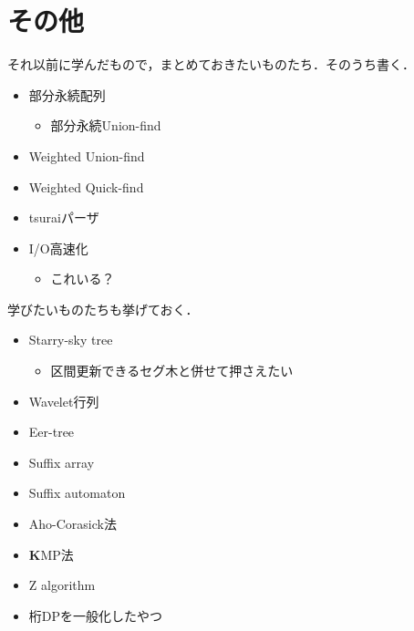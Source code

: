 \documentclass[a4paper]{jsarticle}
\begin{document}
\section{その他}
それ以前に学んだもので，まとめておきたいものたち．そのうち書く．
\begin{itemize}
\item 部分永続配列
  \begin{itemize}
  \item 部分永続Union-find
  \end{itemize}
\item Weighted Union-find
\item Weighted Quick-find
\item tsuraiパーザ
\item I/O高速化
  \begin{itemize}
  \item これいる？
  \end{itemize}
\end{itemize}
学びたいものたちも挙げておく．
\begin{itemize}
\item Starry-sky tree
  \begin{itemize}
  \item 区間更新できるセグ木と併せて押さえたい
  \end{itemize}
\item Wavelet行列
\item Eer-tree
\item Suffix array
\item Suffix automaton
\item Aho-Corasick法
\item \textbf{K}MP法
\item Z algorithm
\item 桁DPを一般化したやつ
\end{itemize}
\end{document}
